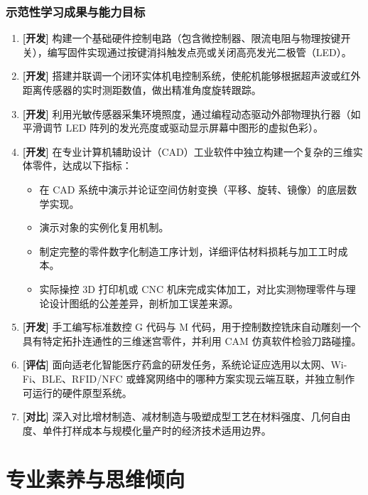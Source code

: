 \subsubsection{示范性学习成果与能力目标}
\begin{enumerate}
    \item \textbf{[开发]} 构建一个基础硬件控制电路（包含微控制器、限流电阻与物理按键开关），编写固件实现通过按键消抖触发点亮或关闭高亮发光二极管（LED）。
    \item \textbf{[开发]} 搭建并联调一个闭环实体机电控制系统，使舵机能够根据超声波或红外距离传感器的实时测距数值，做出精准角度旋转跟踪。
    \item \textbf{[开发]} 利用光敏传感器采集环境照度，通过编程动态驱动外部物理执行器（如平滑调节 LED 阵列的发光亮度或驱动显示屏幕中图形的虚拟色彩）。
    \item \textbf{[开发]} 在专业计算机辅助设计（CAD）工业软件中独立构建一个复杂的三维实体零件，达成以下指标：
    \begin{itemize}
        \item 在 CAD 系统中演示并论证空间仿射变换（平移、旋转、镜像）的底层数学实现。
        \item 演示对象的实例化复用机制。
        \item 制定完整的零件数字化制造工序计划，详细评估材料损耗与加工工时成本。
        \item 实际操控 3D 打印机或 CNC 机床完成实体加工，对比实测物理零件与理论设计图纸的公差差异，剖析加工误差来源。
    \end{itemize}
    \item \textbf{[开发]} 手工编写标准数控 G 代码与 M 代码，用于控制数控铣床自动雕刻一个具有特定拓扑连通性的三维迷宫零件，并利用 CAM 仿真软件检验刀路碰撞。
    \item \textbf{[评估]} 面向适老化智能医疗药盒的研发任务，系统论证应选用以太网、Wi-Fi、BLE、RFID/NFC 或蜂窝网络中的哪种方案实现云端互联，并独立制作可运行的硬件原型系统。
    \item \textbf{[对比]} 深入对比增材制造、减材制造与吸塑成型工艺在材料强度、几何自由度、单件打样成本与规模化量产时的经济技术适用边界。
\end{enumerate}

\section{专业素养与思维倾向}

